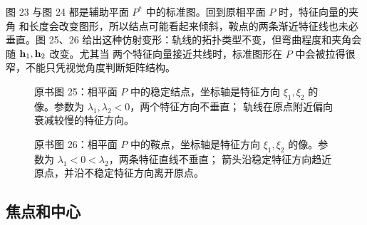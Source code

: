 图 23 与图 24 都是辅助平面 \(P^*\) 中的标准图。回到原相平面 \(P\) 时，特征向量的夹角
和长度会改变图形，所以结点可能看起来倾斜，鞍点的两条渐近特征线也未必垂直。图 25、26
给出这种仿射变形：轨线的拓扑类型不变，但弯曲程度和夹角会随 \(\vect{h}_1,\vect{h}_2\) 改变。尤其当
两个特征向量接近共线时，标准图形在 \(P\) 中会被拉得很窄，不能只凭视觉角度判断矩阵结构。

\begin{figure}[H]
 \centering
 
 \caption{原书图 25：相平面 \(P\) 中的稳定结点，坐标轴是特征方向
 \(\xi_1,\xi_2\) 的像。参数为 \(\lambda_1,\lambda_2<0\)，两个特征方向不垂直；
 轨线在原点附近偏向衰减较慢的特征方向。}
 \label{fig:ch2-p2-25}
\end{figure}

\begin{figure}[H]
 \centering
 
 \caption{原书图 26：相平面 \(P\) 中的鞍点，坐标轴是特征方向
 \(\xi_1,\xi_2\) 的像。参数为 \(\lambda_1<0<\lambda_2\)，两条特征直线不垂直；
 箭头沿稳定特征方向趋近原点，并沿不稳定特征方向离开原点。}
 \label{fig:ch2-p2-26}
\end{figure}

\subsection*{焦点和中心}

